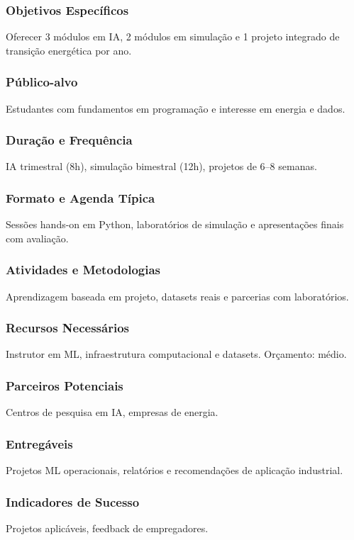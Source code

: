 \documentclass[12pt,a4paper]{article}
\begin{document}
\subsubsection*{Objetivos Específicos}
Oferecer 3 módulos em IA, 2 módulos em simulação e 1 projeto integrado de transição energética por ano.

\subsubsection*{Público-alvo}
Estudantes com fundamentos em programação e interesse em energia e dados.

\subsubsection*{Duração e Frequência}
IA trimestral (8h), simulação bimestral (12h), projetos de 6–8 semanas.

\subsubsection*{Formato e Agenda Típica}
Sessões hands-on em Python, laboratórios de simulação e apresentações finais com avaliação.

\subsubsection*{Atividades e Metodologias}
Aprendizagem baseada em projeto, datasets reais e parcerias com laboratórios.

\subsubsection*{Recursos Necessários}
Instrutor em ML, infraestrutura computacional e datasets. Orçamento: médio.

\subsubsection*{Parceiros Potenciais}
Centros de pesquisa em IA, empresas de energia.

\subsubsection*{Entregáveis}
Projetos ML operacionais, relatórios e recomendações de aplicação industrial.

\subsubsection*{Indicadores de Sucesso}
Projetos aplicáveis, feedback de empregadores.
\end{document}

